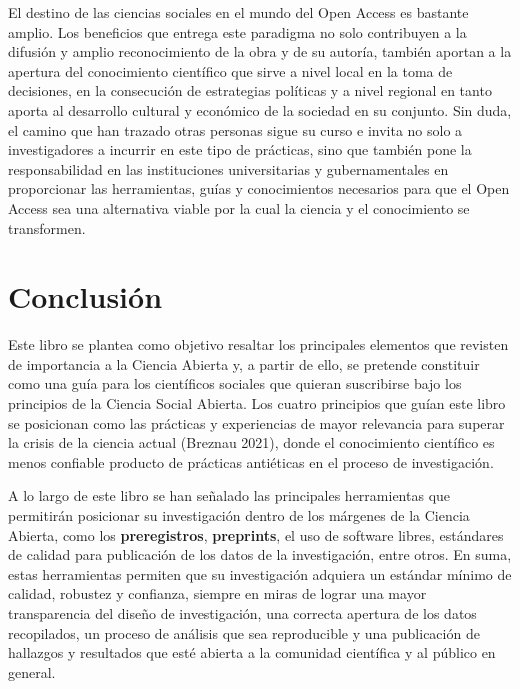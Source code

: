 \documentclass[
  spanish,
  letterpaper,
  DIV=11,
  numbers=noendperiod]{scrreprt}
\begin{document}
El destino de las ciencias sociales en el mundo del Open Access es
bastante amplio. Los beneficios que entrega este paradigma no solo
contribuyen a la difusión y amplio reconocimiento de la obra y de su
autoría, también aportan a la apertura del conocimiento científico que
sirve a nivel local en la toma de decisiones, en la consecución de
estrategias políticas y a nivel regional en tanto aporta al desarrollo
cultural y económico de la sociedad en su conjunto. Sin duda, el camino
que han trazado otras personas sigue su curso e invita no solo a
investigadores a incurrir en este tipo de prácticas, sino que también
pone la responsabilidad en las instituciones universitarias y
gubernamentales en proporcionar las herramientas, guías y conocimientos
necesarios para que el Open Access sea una alternativa viable por la
cual la ciencia y el conocimiento se transformen.


\chapter{Conclusión}\label{conclusiuxf3n}

Este libro se plantea como objetivo resaltar los principales elementos
que revisten de importancia a la Ciencia Abierta y, a partir de ello, se
pretende constituir como una guía para los científicos sociales que
quieran suscribirse bajo los principios de la Ciencia Social Abierta.
Los cuatro principios que guían este libro se posicionan como las
prácticas y experiencias de mayor relevancia para superar la crisis de
la ciencia actual (Breznau 2021), donde el conocimiento científico es
menos confiable producto de prácticas antiéticas en el proceso de
investigación.

A lo largo de este libro se han señalado las principales herramientas
que permitirán posicionar su investigación dentro de los márgenes de la
Ciencia Abierta, como los \textbf{preregistros}, \textbf{preprints}, el
uso de software libres, estándares de calidad para publicación de los
datos de la investigación, entre otros. En suma, estas herramientas
permiten que su investigación adquiera un estándar mínimo de calidad,
robustez y confianza, siempre en miras de lograr una mayor transparencia
del diseño de investigación, una correcta apertura de los datos
recopilados, un proceso de análisis que sea reproducible y una
publicación de hallazgos y resultados que esté abierta a la comunidad
científica y al público en general.
\end{document}
